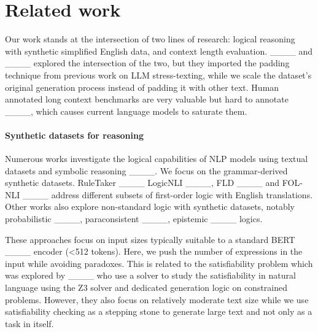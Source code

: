 \section{Related work}
Our work stands at the intersection of two lines of research: logical reasoning with synthetic simplified English data, and context length evaluation. ____ and ____ explored the intersection of the two, but they imported the padding technique from previous work on LLM stress-texting, while we scale the dataset's original generation process instead of padding it with other text.
Human annotated long context benchmarks are very valuable but hard to annotate ____, which causes current language models to saturate them.

\paragraph{Synthetic datasets for reasoning}


Numerous works investigate the logical capabilities of NLP models using textual datasets and symbolic reasoning ____. We focus on the grammar-derived synthetic datasets. RuleTaker ____ LogicNLI ____, FLD ____ and FOL-NLI ____ address different subsets of first-order logic with English translations. Other works also explore non-standard logic with synthetic datasets, notably probabilistic ____, paraconsistent ____, epistemic ____ logics.

These approaches focus on input sizes typically suitable to a standard BERT ____ encoder (<512 tokens). Here, we push the number of expressions in the input while avoiding paradoxes. This is related to the satisfiability problem which was explored by ____ who use a solver to study the satisfiability in natural language using the Z3 solver and dedicated generation logic on constrained problems.  However, they also focus on relatively moderate text size while we use satisfiability checking as a stepping stone to generate large text and not only as a task in itself.

